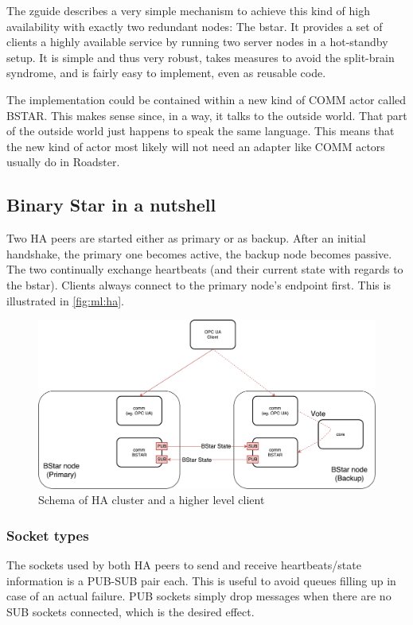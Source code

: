 The \gls{zguide} describes a very simple mechanism to achieve this kind of high
availability with exactly two redundant nodes: The \gls{bstar}. It
provides a set of clients a highly available service by running two server
nodes in a hot-standby setup. It is simple and thus very robust, takes measures to avoid the
split-brain syndrome, and is fairly easy to implement, even as reusable
code.

The implementation could be contained within a new kind of COMM actor
called BSTAR. This makes sense since, in a way, it talks to the outside world.
That part of the outside world just happens to speak the same language. This
means that the new kind of actor most likely will not need an adapter like COMM
actors usually do in Roadster.

\subsection{Binary Star in a nutshell}
Two HA peers are started either as primary or as backup. After an initial
handshake, the primary one becomes active, the backup node becomes passive. The
two continually exchange heartbeats (and their current state with regards to
the \gls{bstar}). Clients always connect to the primary node's endpoint first. This
is illustrated in \autoref{fig:ml:ha}.

\begin{figure}[]
	\includegraphics[width=\textwidth]{img/ML-HA_bstar.pdf}
	\caption{Schema of HA cluster and a higher level client}
	\label{fig:ml:ha}
\end{figure}

\subsubsection{Socket types}
The sockets used by both HA peers to send and receive heartbeats/state
information is a PUB-SUB pair each. This is useful to avoid queues filling up
in case of an actual failure. PUB sockets simply drop messages when there are
no SUB sockets connected, which is the desired effect.

